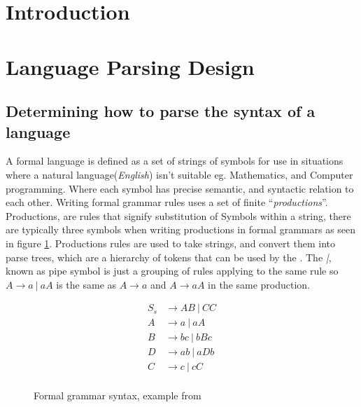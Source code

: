 
\section{Introduction}

\newpage
\section{Language Parsing Design}

\subsection{Determining how to parse the syntax of a language}

A formal language is defined as a set of strings of symbols for use in situations where a natural language(\textit{English}) isn't suitable eg. Mathematics, and Computer programming. Where each symbol has precise semantic, and syntactic relation to each other. Writing formal grammar rules uses a set of finite ``\textit{productions}''. Productions, are rules that signify substitution of Symbols within a string, there are typically three symbols when writing productions in formal grammars as seen in figure \ref{fig:formalGrammar}. Productions rules are used to take strings, and convert them into parse trees, which are a hierarchy of tokens that can be used by the \compiler{}. The \emph{|}, known as pipe symbol is just a grouping of rules applying to the same rule so $A \rightarrow a\ |\ aA$ is the same as $A \rightarrow a$ and $ A \rightarrow aA$ in the same production.

\begin{figure}[ht!]
    \begin{align*}
    S_s &\rightarrow AB\ |\ CC \\
    A &\rightarrow a\ |\ aA \\
    B &\rightarrow bc\ |\ bBc \\
    D &\rightarrow ab\ |\ aDb \\
    C &\rightarrow c\ |\ cC \\
    \end{align*}
    \caption{Formal grammar syntax, example from \cite{ParseTech}}
    \label{fig:formalGrammar}
\end{figure}

